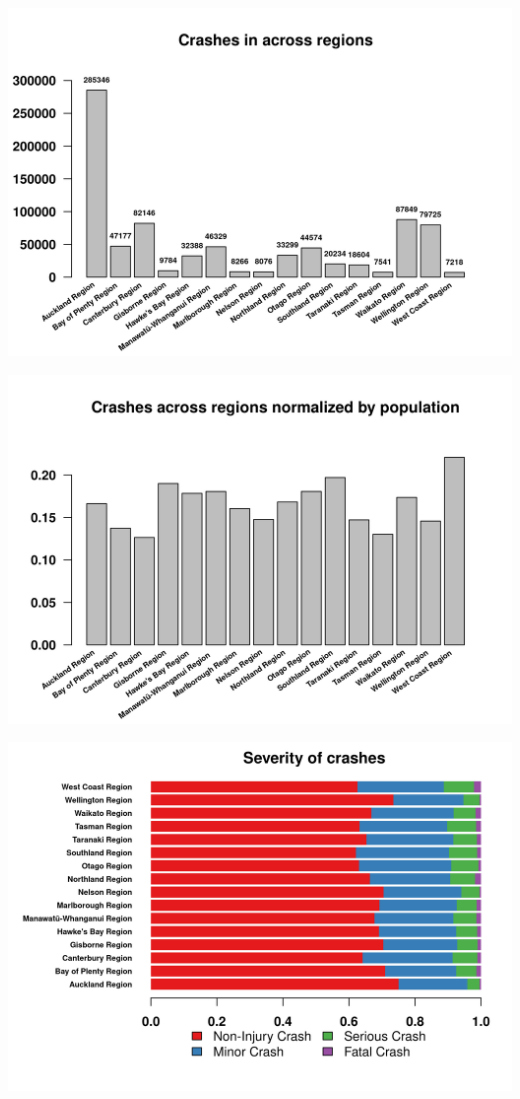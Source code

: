 \documentclass[xcolor=dvipsnames,xcolor=table, 14p]{beamer}
\begin{document}
\begin{frame}
    \centering
    \includegraphics[width=1\textwidth]{figures/location2-1.png}
\end{frame}

\begin{frame}
    \centering
    \includegraphics[width=1\textwidth]{figures/population3-1.png}
\end{frame}

\begin{frame}
    \centering
    \includegraphics[width=1\textwidth]{figures/regions-1.png}
\end{frame}
\end{document}
